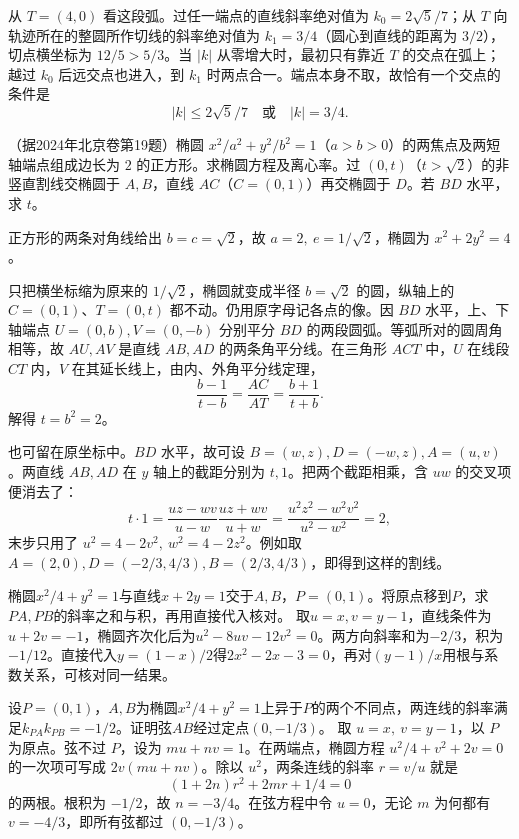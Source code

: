 从 \(T=(4,0)\) 看这段弧。过任一端点的直线斜率绝对值为 \(k_0=2\sqrt5/7\)；从 \(T\) 向轨迹所在的整圆所作切线的斜率绝对值为 \(k_1=3/4\)（圆心到直线的距离为 \(3/2\)），切点横坐标为 \(12/5>5/3\)。当 \(|k|\) 从零增大时，最初只有靠近 \(T\) 的交点在弧上；越过 \(k_0\) 后远交点也进入，到 \(k_1\) 时两点合一。端点本身不取，故恰有一个交点的条件是
\[
    |k|\le 2\sqrt5/7\quad\text{或}\quad |k|=3/4 .
\]


（据2024年北京卷第19题）椭圆 \(x^2/a^2+y^2/b^2=1\)（\(a>b>0\)）的两焦点及两短轴端点组成边长为 \(2\) 的正方形。求椭圆方程及离心率。过 \((0,t)\)（\(t>\sqrt2\)）的非竖直割线交椭圆于 \(A,B\)，直线 \(AC\)（\(C=(0,1)\)）再交椭圆于 \(D\)。若 \(BD\) 水平，求 \(t\)。
\par
\solutionanswer
正方形的两条对角线给出 \(b=c=\sqrt2\)，故 \(a=2,\ e=1/\sqrt2\)，椭圆为 \(x^2+2y^2=4\)。

只把横坐标缩为原来的 \(1/\sqrt2\)，椭圆就变成半径 \(b=\sqrt2\) 的圆，纵轴上的 \(C=(0,1)\)、\(T=(0,t)\) 都不动。仍用原字母记各点的像。因 \(BD\) 水平，上、下轴端点 \(U=(0,b),V=(0,-b)\) 分别平分 \(BD\) 的两段圆弧。等弧所对的圆周角相等，故 \(AU,AV\) 是直线 \(AB,AD\) 的两条角平分线。在三角形 \(ACT\) 中，\(U\) 在线段 \(CT\) 内，\(V\) 在其延长线上，由内、外角平分线定理，
\[
    \frac{b-1}{t-b}=\frac{AC}{AT}=\frac{b+1}{t+b}.
\]
解得 \(t=b^2=2\)。

也可留在原坐标中。\(BD\) 水平，故可设 \(B=(w,z),D=(-w,z),A=(u,v)\)。两直线 \(AB,AD\) 在 \(y\) 轴上的截距分别为 \(t,1\)。把两个截距相乘，含 \(uw\) 的交叉项便消去了：
\[
 t\cdot1=\frac{uz-wv}{u-w}\frac{uz+wv}{u+w}
        =\frac{u^2z^2-w^2v^2}{u^2-w^2}=2,
\]
末步只用了 \(u^2=4-2v^2,\ w^2=4-2z^2\)。例如取 \(A=(2,0),D=(-2/3,4/3),B=(2/3,4/3)\)，即得到这样的割线。


椭圆\(x^2/4+y^2=1\)与直线\(x+2y=1\)交于\(A,B\)，\(P=(0,1)\)。将原点移到\(P\)，求\(PA,PB\)的斜率之和与积，再用直接代入核对。
\solutionanswer
取\(u=x,v=y-1\)，直线条件为\(u+2v=-1\)，椭圆齐次化后为\(u^2-8uv-12v^2=0\)。两方向斜率和为\(-2/3\)，积为\(-1/12\)。直接代入\(y=(1-x)/2\)得\(2x^2-2x-3=0\)，再对\((y-1)/x\)用根与系数关系，可核对同一结果。


设\(P=(0,1)\)，\(A,B\)为椭圆\(x^2/4+y^2=1\)上异于\(P\)的两个不同点，两连线的斜率满足\(k_{PA}k_{PB}=-1/2\)。证明弦\(AB\)经过定点\((0,-1/3)\)。
\solutionanswer
取 \(u=x,\ v=y-1\)，以 \(P\) 为原点。弦不过 \(P\)，设为 \(mu+nv=1\)。在两端点，椭圆方程 \(u^2/4+v^2+2v=0\) 的一次项可写成 \(2v(mu+nv)\)。除以 \(u^2\)，两条连线的斜率 \(r=v/u\) 就是
\[
 (1+2n)r^2+2mr+1/4=0
\]
的两根。根积为 \(-1/2\)，故 \(n=-3/4\)。在弦方程中令 \(u=0\)，无论 \(m\) 为何都有 \(v=-4/3\)，即所有弦都过 \((0,-1/3)\)。

